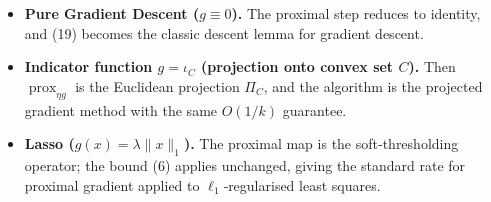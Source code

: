 \documentclass{article}
\newcommand{\prox}{\operatorname{prox}}
\begin{document}
\begin{itemize}
\item \textbf{Pure Gradient Descent ($g\equiv0$).} The proximal step reduces to identity, and (19) becomes the classic descent lemma for gradient descent.
\item \textbf{Indicator function $g=\iota_{C}$ (projection onto convex set $C$).} Then $\prox_{\eta g}$ is the Euclidean projection $\Pi_{C}$, and the algorithm is the projected gradient method with the same $O(1/k)$ guarantee.
\item \textbf{Lasso ($g(x)=\lambda\|x\|_{1}$).} The proximal map is the soft‑thresholding operator; the bound (6) applies unchanged, giving the standard rate for proximal gradient applied to $\ell_{1}$‑regularised least squares.
\end{itemize}
\end{document}
